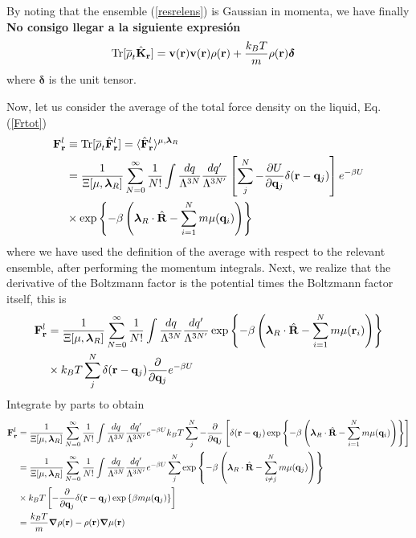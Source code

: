 \documentclass[a4paper,openright,12pt]{book}
\newcommand{\Note}[1]{{\bf \color{red}#1}}    %
\begin{document}
By noting that the ensemble (\ref{resrelens}) is Gaussian in momenta, we have finally \Note{No consigo llegar a la siguiente expresión}
\begin{align}
  {\rm Tr}[\overline{\rho}_t \hat{{\bf K}}_{\bf r}] &=
{\bf v}({\bf r}){\bf v}({\bf r}){\rho}({\bf r})+\frac{k_BT}{m}\rho({\bf r})\boldsymbol{\delta}
\label{api}
\end{align}
where $\boldsymbol{\delta}$ is the unit  tensor.  

Now, let us consider the average of the total force density on the liquid, Eq. (\ref{Frtot})
\begin{align}
{\bf F}^l_{\bf r} &\equiv{\rm Tr}[\overline{\rho}_t \hat{\bf F}^l_{\bf r}] =
 \langle \hat{\bf F}^l_{\bf r}\rangle^{\mu,\boldsymbol{\lambda}_R}
\nonumber\\
&=
\frac{1}{\Xi[\mu,\boldsymbol{\lambda}_R]}
 \sum_{N=0}^\infty \frac{1}{N!}
\int \frac{dq}{\Lambda^{3N}}\frac{dq'}{\Lambda^{3N'}}
\left[\sum^{N}_{j}-\frac{\partial U}{\partial {\bf q}_{j}}\delta({\bf r}-{\bf q}_j)\right]
e^{-\beta U}
\nonumber\\
&\times \exp\left\{-\beta  \left( \boldsymbol{\lambda}_R\cdot\hat{\bf R}
-\sum_{i=1}^N m\mu({\bf q}_i)\right)\right\}
\end{align}
where we have  used the definition of the average  with respect to the
relevant ensemble,  after performing the momentum  integrals. Next, we
realize that the  derivative of the Boltzmann factor  is the potential
times the Boltzmann factor itself, this is
\begin{align}
{\bf F}^l_{\bf r}&=
\frac{1}{\Xi[\mu,\boldsymbol{\lambda}_R]}
 \sum_{N=0}^\infty \frac{1}{N!}
\int \frac{dq}{\Lambda^{3N}}\frac{dq'}{\Lambda^{3N'}}
\exp\left\{-\beta  \left(\boldsymbol{\lambda}_R\cdot\hat{\bf R}
-\sum_{i=1}^N m\mu({\bf   r}_i)\right)\right\}
\nonumber\\
&\times k_BT\sum^{N}_{j}\delta({\bf r}-{\bf q}_j)\frac{\partial }{\partial {\bf q}_{j}}e^{-\beta U}
\end{align}
Integrate by parts to obtain
\begin{align}
{\bf F}^l_{\bf r}&=
\frac{1}{\Xi[\mu,\boldsymbol{\lambda}_R]}
 \sum_{N=0}^\infty \frac{1}{N!}
\int \frac{dq}{\Lambda^{3N}}\frac{dq'}{\Lambda^{3N'}}
e^{-\beta U}
k_BT\sum^{N}_{j}-\frac{\partial }{\partial {\bf q}_{j}}\left[\delta({\bf r}-{\bf q}_j)
\exp\left\{-\beta  \left( \boldsymbol{\lambda}_R\cdot\hat{\bf R}
-\sum_{i=1}^N m\mu({\bf q}_i)\right)\right\}\right]
\nonumber\\
&=
\frac{1}{\Xi[\mu,\boldsymbol{\lambda}_R]}
 \sum_{N=0}^\infty \frac{1}{N!}
\int \frac{dq}{\Lambda^{3N}}\frac{dq'}{\Lambda^{3N'}}
e^{-\beta U}
\sum^{N}_{j}\exp\left\{-\beta  \left( \boldsymbol{\lambda}_R\cdot\hat{\bf R}
-\sum_{i\neq j}^N m\mu({\bf   q}_j)\right)\right\}
\nonumber\\
&\times k_BT\left[-\frac{\partial }{\partial {\bf q}_{j}}\delta({\bf r}-{\bf q}_j)
\exp\left\{\beta   m\mu({\bf   q}_j)\right\}\right]
\nonumber\\
&=\frac{k_BT}{m}\boldsymbol{\nabla} \rho({\bf r})
-\rho({\bf r})\boldsymbol{\nabla}\mu({\bf r})
\label{fllr}
\end{align}
\end{document}
